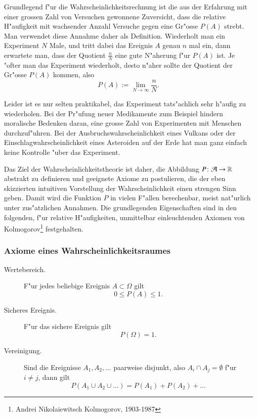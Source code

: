 Grundlegend f"ur die Wahrscheinlichkeitsrechnung ist die aus der
Erfahrung mit einer grossen Zahl von Versuchen gewonnene Zuversicht,
dass die relative H"aufigkeit mit wachsender Anzahl Versuche gegen
eine Gr"osse $P(A)$ strebt.
Man verwendet diese Annahme daher als Definition.
Wiederholt man ein Experiment $N$ Male, und tritt dabei das Ereignis $A$
genau $n$ mal ein, dann erwartete man, dass der Quotient $\frac{n}{N}$
eine gute N"aherung f"ur $P(A)$ ist.
Je "ofter man das Experiment
wiederholt, desto n"aher sollte der Quotient der Gr"osse $P(A)$
kommen, also
\[
P(A) := \lim_{N\to\infty}\frac{n}{N}.
\]

Leider ist es nur selten praktikabel, das Experiment tats"achlich
sehr h"aufig zu wiederholen.
Bei der Pr"ufung neuer Medikamente
zum Beispiel hindern moralische Bedenken daran, eine grosse
Zahl von Experimenten mit Menschen durchzuf"uhren.
Bei der
Ausbruchswahrscheinlichkeit eines Vulkans oder der
Einschlagwahrscheinlichkeit eines Asteroiden auf der Erde hat man
ganz einfach keine Kontrolle "uber das Experiment.

Das Ziel der Wahrscheinlichkeitstheorie ist daher, 
die Abbildung $P\colon {\cal A}\to\mathbb{R}$
abstrakt zu definieren und geeignete Axiome zu postulieren, die
der eben skizzierten intuitiven Vorstellung der Wahrscheinlichkeit
einen strengen Sinn geben.
Damit wird die Funktion $P$ in vielen
F"allen berechenbar, meist nat"urlich unter zus"atzlichen Annahmen.
Die grundlegenden Eigenschaften sind in den folgenden, f"ur
relative H"aufigkeiten, unmittelbar einleuchtenden Axiomen
von Kolmogorov\footnote{Andrei Nikolaiewitsch Kolmogorov, 1903-1987}
festgehalten.

\subsubsection{Axiome  eines Wahrscheinlichkeitsraumes}

\begin{description}
\item[Wertebereich.]F"ur jedes beliebige Ereignis $A\subset \Omega$
gilt
\begin{equation}
0\le P(A)\le 1.
\label{p-wertebereich}
\end{equation}
\item[Sicheres Ereignis.] F"ur das sichere Ereignis gilt
\begin{equation}
P(\Omega) = 1.
\label{p-sicheresereignis}
\end{equation}
\item[Vereinigung.] Sind die Ereignisse $A_1,A_2,\dots$ paarweise
disjunkt, also $A_i\cap A_j=\emptyset$ f"ur $i\ne j$, dann gilt
\begin{equation}
P(A_1\cup A_2\cup \dots) = P(A_1) + P(A_2) + \dots
\label{p-summenformel}
\end{equation}
\end{description}

